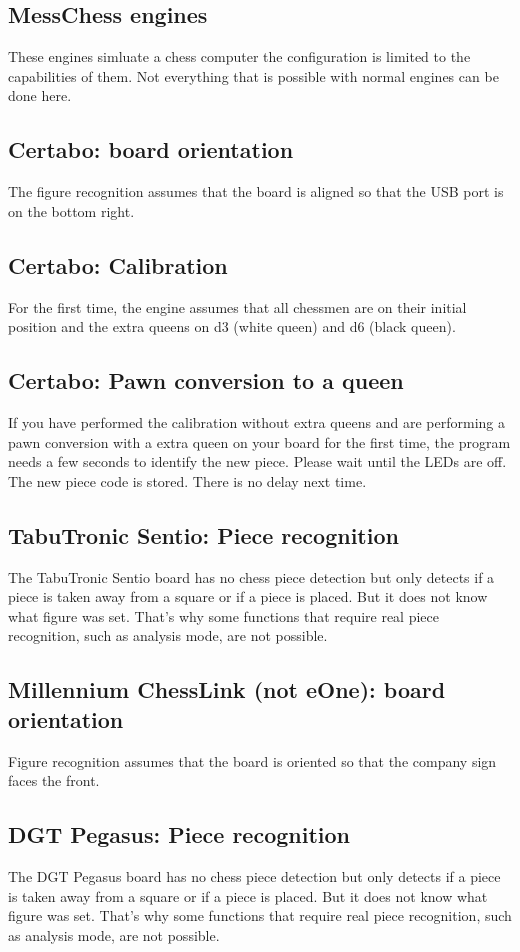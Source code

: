 \documentclass[11pt,a4paper]{article}
\begin{document}
\subsection{MessChess engines}
These engines simluate a chess computer the configuration is limited to the capabilities of them. Not everything that is possible with normal engines can be done here. 

\subsection{Certabo: board orientation}
The figure recognition assumes that the board is aligned so that the USB port is on the bottom right.

\subsection{Certabo: Calibration}
For the first time, the engine assumes that all chessmen are on their initial position and the extra queens on d3 (white queen) and d6 (black queen).

\subsection{Certabo: Pawn conversion to a queen}
If you have performed the calibration without extra queens and are performing a pawn conversion with a extra queen on your board for the first time, the program needs a few seconds to identify the new piece. Please wait until the LEDs are off. The new piece code is stored. There is no delay next time.


\subsection{TabuTronic Sentio: Piece recognition}
The TabuTronic Sentio board has no chess piece detection but only detects if a piece is taken away from a square or if a piece is placed. But it does not know what figure was set. That's why some functions that require real piece recognition, such as analysis mode, are not possible.

\subsection{Millennium ChessLink (not eOne): board orientation}
Figure recognition assumes that the board is oriented so that the company sign faces the front.

\subsection{DGT Pegasus: Piece recognition}
The DGT Pegasus board has no chess piece detection but only detects if a piece is taken away from a square or if a piece is placed. But it does not know what figure was set. That's why some functions that require real piece recognition, such as analysis mode, are not possible.
\end{document}
